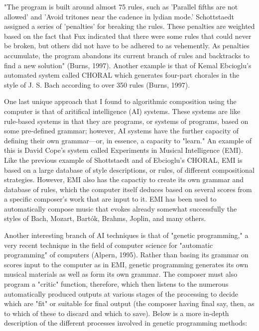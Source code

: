 \documentclass{automatextcc}
\begin{document}
"The program is built around almost 75 rules, such as 'Parallel fifths are not allowed' and 'Avoid tritones near the cadence in lydian mode.' Schottstaedt assigned a series of 'penalties' for breaking the rules. These penalties are weighted based on the fact that Fux indicated that there were some rules that could never be broken, but others did not have to be adhered to as vehemently. As penalties accumulate, the program abandons its current branch of rules and backtracks to find a new solution" (Burns, 1997).
Another example is that of Kemal Ebcioglu's automated system called CHORAL which generates four-part chorales in the style of J. S. Bach according to over 350 rules (Burns, 1997).

One last unique approach that I found to algorithmic composition using the computer is that of aritifical intelligence (AI) systems. These systems are like rule-based systems in that they are programs, or systems of programs, based on some pre-defined grammar; however, AI systems have the further capacity of defining their own grammar—or, in essence, a capacity to "learn." An example of this is David Cope's system called Experiments in Musical Intelligence (EMI). Like the previous example of Shottstaedt and of Ebcioglu's CHORAL, EMI is based on a large database of style descriptions, or rules, of different compositional strategies. However, EMI also has the capactiy to create its own grammar and database of rules, which the computer itself deduces based on several scores from a specific composer's work that are input to it. EMI has been used to automatically compose music that evokes already somewhat successfully the styles of Bach, Mozart, Bartók, Brahms, Joplin, and many others.

Another interesting branch of AI techniques is that of "genetic programming," a very recent technique in the field of computer science for "automatic programming" of computers (Alpern, 1995). Rather than basing its grammar on scores input to the computer as in EMI, genetic programming generates its own musical materials as well as form its own grammar. The composer must also program a "critic" function, therefore, which then listens to the numerous automatically produced outputs at various stages of the processing to decide which are "fit" or suitable for final output (the composer having final say, then, as to which of these to discard and which to save). Below is a more in-depth description of the different processes involved in genetic programming methods:
\end{document}
